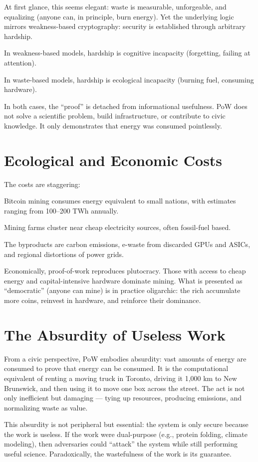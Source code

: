\documentclass{book}
\begin{document}
At first glance, this seems elegant: waste is measurable, unforgeable, and equalizing (anyone can, in principle, burn energy). Yet the underlying logic mirrors weakness-based cryptography: security is established through arbitrary hardship.

In weakness-based models, hardship is cognitive incapacity (forgetting, failing at attention).

In waste-based models, hardship is ecological incapacity (burning fuel, consuming hardware).

In both cases, the “proof” is detached from informational usefulness. PoW does not solve a scientific problem, build infrastructure, or contribute to civic knowledge. It only demonstrates that energy was consumed pointlessly.

\section{Ecological and Economic Costs}

The costs are staggering:

Bitcoin mining consumes energy equivalent to small nations, with estimates ranging from 100–200 TWh annually.

Mining farms cluster near cheap electricity sources, often fossil-fuel based.

The byproducts are carbon emissions, e-waste from discarded GPUs and ASICs, and regional distortions of power grids.

Economically, proof-of-work reproduces plutocracy. Those with access to cheap energy and capital-intensive hardware dominate mining. What is presented as “democratic” (anyone can mine) is in practice oligarchic: the rich accumulate more coins, reinvest in hardware, and reinforce their dominance.

\section{The Absurdity of Useless Work}

From a civic perspective, PoW embodies absurdity: vast amounts of energy are consumed to prove that energy can be consumed. It is the computational equivalent of renting a moving truck in Toronto, driving it 1,000 km to New Brunswick, and then using it to move one box across the street. The act is not only inefficient but damaging — tying up resources, producing emissions, and normalizing waste as value.

This absurdity is not peripheral but essential: the system is only secure because the work is useless. If the work were dual-purpose (e.g., protein folding, climate modeling), then adversaries could “attack” the system while still performing useful science. Paradoxically, the wastefulness of the work is its guarantee.
\end{document}
